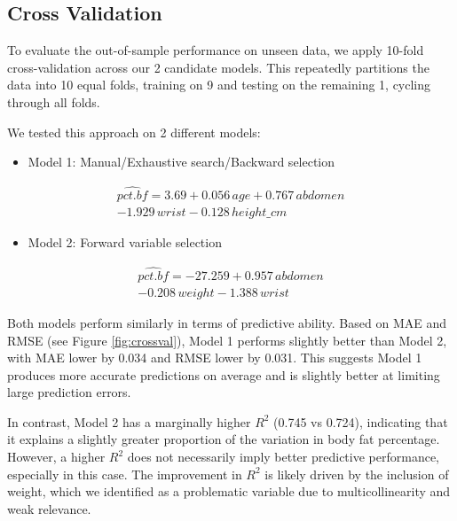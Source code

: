 \documentclass[letterpaper,9pt,twocolumn,twoside,]{pinp}
\providecommand{\tightlist}{%
  \setlength{\itemsep}{0pt}\setlength{\parskip}{0pt}}
\begin{document}
\subsection{Cross Validation}\label{cross-validation}

To evaluate the out-of-sample performance on unseen data, we apply
10-fold cross-validation across our 2 candidate models. This repeatedly
partitions the data into 10 equal folds, training on 9 and testing on
the remaining 1, cycling through all folds.

We tested this approach on 2 different models:

\begin{itemize}
\tightlist
\item
  Model 1: Manual/Exhaustive search/Backward selection
\end{itemize}

\vspace{-12pt}

\begin{multline}
\widehat{pct.bf} = 3.69 + 0.056\,age + 0.767\,abdomen \\ 
- 1.929\,wrist - 0.128\,height\_cm
\label{eqn:model1}
\end{multline} \vspace{-12pt}

\begin{itemize}
\tightlist
\item
  Model 2: Forward variable selection
\end{itemize}

\vspace{-12pt}

\begin{multline}
\widehat{pct.bf} = -27.259 + 0.957\,abdomen \\ 
- 0.208\,weight - 1.388\,wrist
\label{eqn:model2}
\end{multline} \vspace{-12pt}

Both models perform similarly in terms of predictive ability. Based on
MAE and RMSE (see Figure \ref{fig:crossval}), Model 1 performs slightly
better than Model 2, with MAE lower by 0.034 and RMSE lower by 0.031.
This suggests Model 1 produces more accurate predictions on average and
is slightly better at limiting large prediction errors.

In contrast, Model 2 has a marginally higher \(R^2\) (0.745 vs 0.724),
indicating that it explains a slightly greater proportion of the
variation in body fat percentage. However, a higher \(R^2\) does not
necessarily imply better predictive performance, especially in this
case. The improvement in \(R^2\) is likely driven by the inclusion of
weight, which we identified as a problematic variable due to
multicollinearity and weak relevance.
\end{document}
